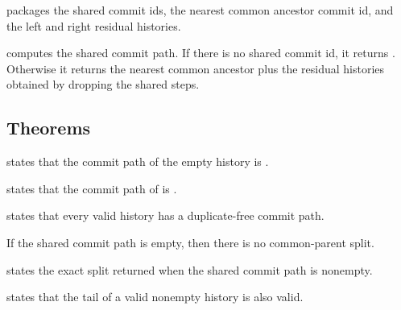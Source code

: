 \begin{definition}[CommonParentSplit]
\code{[CommonParentSplit]} packages the shared commit ids, the nearest common
ancestor commit id, and the left and right residual histories.
\end{definition}

\begin{definition}[splitAtNearestCommonParent?]
\code{[splitAtNearestCommonParent?]} computes the shared commit path. If there
is no shared commit id, it returns . Otherwise it returns the nearest
common ancestor plus the residual histories obtained by dropping the shared
steps.
\end{definition}

\subsection{Theorems}

\begin{theorem}
 states that the commit path of the empty history is
\code{[]}.
\end{theorem}

\begin{theorem}
 states that the commit path of \code{[step]} is
.
\end{theorem}

\begin{theorem}
 states that every valid history has a
duplicate-free commit path.
\end{theorem}

\begin{theorem}
If the shared commit path is empty, then there is no common-parent split.
\end{theorem}

\begin{theorem}
 states the exact split returned when
the shared commit path is nonempty.
\end{theorem}

\begin{theorem}
 states that the tail of a valid nonempty history is
also valid.
\end{theorem}


